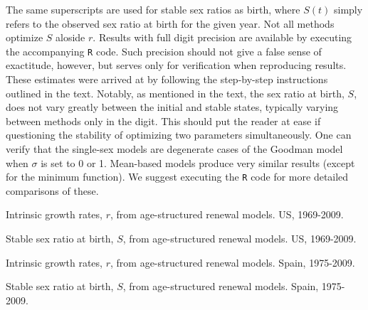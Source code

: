 The same superscripts are used for stable sex ratios as birth, where $S(t)$
simply refers to the observed sex ratio at birth for the given year. Not
all methods optimize $S$ aloside $r$. Results with full digit precision are
available by executing the accompanying \texttt{R} code. Such precision 
should not give a false sense of exactitude, however, but
serves only for verification when reproducing results. These estimates were
arrived at by following the step-by-step instructions outlined in the text.
Notably, as mentioned in the text, the sex ratio at birth, $S$, does not vary
greatly between the initial and stable states, typically varying between
methods only in the  digit. This should put the reader at ease if
questioning the stability of optimizing two parameters simultaneously. One can
verify that the single-sex models are degenerate cases of the Goodman model when
$\sigma$ is set to 0 or 1. Mean-based models produce very similar results
(except for the minimum function). We suggest executing the \texttt{R} code for
more detailed comparisons of these.

\begin{landscape}
\begin{table}
  \begin{adjustwidth}{-1in}{-.5in}
  \centering
    \caption{Intrinsic growth rates, $r$, from age-structured renewal models.
    US, 1969-2009.}
    \label{tab:USageALL}
        \scriptsize{}
  \end{adjustwidth}
\end{table}
\end{landscape}

\begin{table}
  \begin{adjustwidth}{-1in}{-.5in}
  \centering
    \caption{Stable sex ratio at birth, $S$, from age-structured renewal
    models. US, 1969-2009.}
    \label{tab:USageSRBALL}
        \footnotesize{}
  \end{adjustwidth}
\end{table}

\begin{landscape}
\begin{table}
  \begin{adjustwidth}{-1in}{-.5in}
  \centering
    \caption{Intrinsic growth rates, $r$, from age-structured renewal models.
    Spain, 1975-2009.}
    \label{tab:ESageALL}
        \scriptsize{}
  \end{adjustwidth}
\end{table}
\end{landscape}
\begin{table}
  \begin{adjustwidth}{-1in}{-.5in}
  \centering
    \caption{Stable sex ratio at birth, $S$, from age-structured renewal
    models. Spain, 1975-2009.}
    \label{tab:ESageSRBALL}
        \footnotesize{}
  \end{adjustwidth}
\end{table}


\FloatBarrier